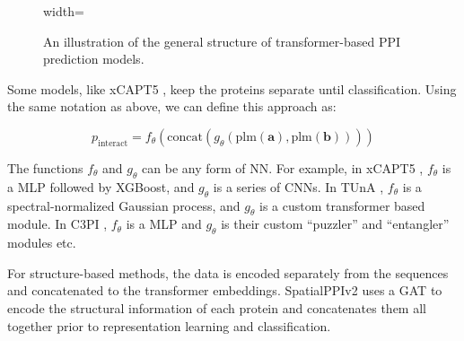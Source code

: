 \documentclass{article}
\begin{document}
\begin{figure}[htbp]
\begin{adjustbox}{width=\textwidth}
  \end{adjustbox}
  \caption{An illustration of the general structure of transformer-based PPI prediction models.}
  \label{fig:transformer-ppi}
\end{figure}

Some models, like xCAPT5 \citep{dang_xcapt5_2024}, keep the proteins separate until classification. Using the same notation as above, we can define this approach as:

\[p_{\text{interact}} = f_\theta(\text{concat}(g_\theta(\text{plm}(\mathbf{a}), \text{plm}(\mathbf{b}))))\] 

The functions \(f_\theta\) and \(g_\theta\) can be any form of NN. For example, in xCAPT5 \citep{dang_xcapt5_2024}, \(f_\theta\) is a MLP followed by XGBoost, and \(g_\theta\) is a series of CNNs. In TUnA \citep{ko_tuna_2024}, \(f_\theta\) is a spectral-normalized Gaussian process, and \(g_\theta\) is a custom transformer based module. In C3PI \citep{hosseini_c3pi_2025}, \(f_\theta\) is a MLP and \(g_\theta\) is their custom ``puzzler'' and ``entangler'' modules etc.

For structure-based methods, the data is encoded separately from the sequences and concatenated to the transformer embeddings. SpatialPPIv2 \citep{hu_spatialppiv2_2025} uses a GAT to encode the structural information of each protein and concatenates them all together prior to representation learning and classification.
\end{document}
